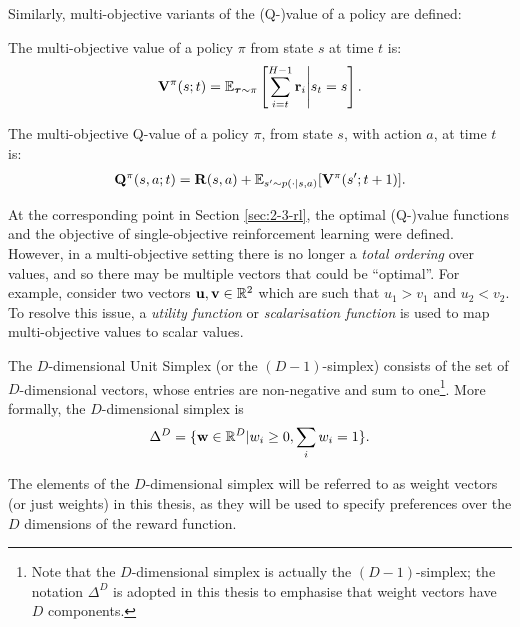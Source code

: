 Similarly, multi-objective variants of the (Q-)value of a policy are defined:    
\begin{defn}
    \label{def:2:mo_value}
    \label{def:2:mo_q_value}
    The \textnormal{multi-objective value} of a policy $\pi$ from state $s$ at time $t$ is:
    \begin{align}
        \mathbf{V}^{\pi}(s;t) = \mathbb{E}_{\boldsymbol{\tau}\sim\pi}\left[\sum_{i=t}^{H-1} \mathbf{r}_i \Bigg| s_t=s \right]. \label{eq:2:mo_value_fn_def}
    \end{align} 

    The \textnormal{multi-objective Q-value} of a policy $\pi$, from state $s$, with action $a$, at time $t$ is:
    \begin{align}
        \mathbf{Q}^{\pi}(s,a;t) = \mathbf{R}(s,a) + \mathbb{E}_{s'\sim p(\cdot|s,a)} [\mathbf{V}^{\pi}(s';t+1)]. \label{eq:2:mo_q_value_fn_def}
    \end{align} 
\end{defn}

At the corresponding point in Section \ref{sec:2-3-rl}, the optimal (Q-)value functions and the objective of single-objective reinforcement learning were defined. However, in a multi-objective setting there is no longer a \textit{total ordering} over values, and so there may be multiple vectors that could be ``optimal''. For example, consider two vectors $\mathbf{u},\mathbf{v}\in\mathbb{R}^2$ which are such that $u_1 > v_1$ and $u_2 < v_2$. To resolve this issue, a \textit{utility function} or \textit{scalarisation function} is used to map multi-objective values to scalar values.

\begin{defn}
    \label{def:2:simplex_and_weight}
    The \textnormal{$D$-dimensional Unit Simplex} (or the \textnormal{$(D-1)$-simplex}) consists of the set of $D$-dimensional vectors, whose entries are non-negative and sum to one\footnote{Note that the $D$-dimensional simplex is actually the $(D-1)$-simplex; the notation $\Delta^D$ is adopted in this thesis to emphasise that weight vectors have $D$ components.}. More formally, the $D$-dimensional simplex is 
    \begin{align}
        \Delta^D = \{\mathbf{w}\in\mathbb{R}^D|w_i \geq 0, \sum_i w_i = 1\}. \label{eq:2:simplex_def}
    \end{align}

    The elements of the $D$-dimensional simplex will be referred to as \textnormal{weight vectors} (or just \textnormal{weights}) in this thesis, as they will be used to specify preferences over the $D$ dimensions of the reward function.
\end{defn}

